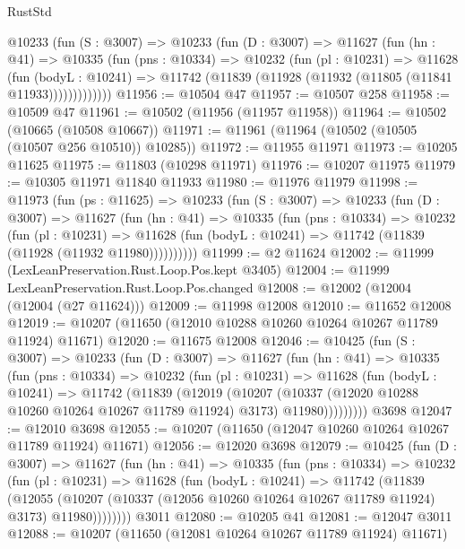 \begin{lexlean}{RustStd}
\begin{coremodule}
      @10233
        (fun (S : @3007) =>
        @10233
          (fun (D : @3007) =>
          @11627
            (fun (hn : @41) =>
            @10335
              (fun (pns : @10334) =>
              @10232
                (fun (pl : @10231) =>
                @11628
                  (fun (bodyL : @10241) =>
                  @11742 (@11839 (@11928 (@11932 (@11805 (@11841 @11933)))))))))))))
@11956 := @10504 @47
@11957 := @10507 @258
@11958 := @10509 @47
@11961 := @10502 (@11956 (@11957 @11958))
@11964 := @10502 (@10665 (@10508 @10667))
@11971 := @11961 (@11964 (@10502 (@10505 (@10507 @256 @10510)) @10285))
@11972 := @11955 @11971
@11973 := @10205 @11625
@11975 := @11803 (@10298 @11971)
@11976 := @10207 @11975
@11979 := @10305 @11971 @11840 @11933
@11980 := @11976 @11979
@11998 := @11973
    (fun (ps : @11625) =>
    @10233
      (fun (S : @3007) =>
      @10233
        (fun (D : @3007) =>
        @11627
          (fun (hn : @41) =>
          @10335
            (fun (pns : @10334) =>
            @10232
              (fun (pl : @10231) =>
              @11628 (fun (bodyL : @10241) => @11742 (@11839 (@11928 (@11932 @11980))))))))))
@11999 := @2 @11624
@12002 := @11999 (LexLeanPreservation.Rust.Loop.Pos.kept @3405)
@12004 := @11999 LexLeanPreservation.Rust.Loop.Pos.changed
@12008 := @12002 (@12004 (@12004 (@27 @11624)))
@12009 := @11998 @12008
@12010 := @11652 @12008
@12019 := @10207 (@11650 (@12010 @10288 @10260 @10264 @10267 @11789 @11924) @11671)
@12020 := @11675 @12008
@12046 := @10425
    (fun (S : @3007) =>
    @10233
      (fun (D : @3007) =>
      @11627
        (fun (hn : @41) =>
        @10335
          (fun (pns : @10334) =>
          @10232
            (fun (pl : @10231) =>
            @11628
              (fun (bodyL : @10241) =>
              @11742
                (@11839
                  (@12019
                    (@10207
                      (@10337 (@12020 @10288 @10260 @10264 @10267 @11789 @11924) @3173)
                      @11980)))))))))
    @3698
@12047 := @12010 @3698
@12055 := @10207 (@11650 (@12047 @10260 @10264 @10267 @11789 @11924) @11671)
@12056 := @12020 @3698
@12079 := @10425
    (fun (D : @3007) =>
    @11627
      (fun (hn : @41) =>
      @10335
        (fun (pns : @10334) =>
        @10232
          (fun (pl : @10231) =>
          @11628
            (fun (bodyL : @10241) =>
            @11742
              (@11839
                (@12055
                  (@10207 (@10337 (@12056 @10260 @10264 @10267 @11789 @11924) @3173) @11980))))))))
    @3011
@12080 := @10205 @41
@12081 := @12047 @3011
@12088 := @10207 (@11650 (@12081 @10264 @10267 @11789 @11924) @11671)

\end{coremodule}
\end{lexlean}
